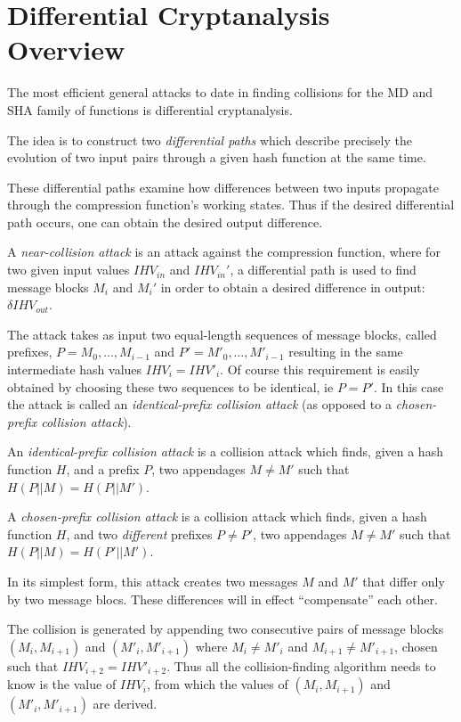 \section{Differential Cryptanalysis Overview}
The most efficient general attacks to date in finding collisions for the MD and SHA family of functions is differential cryptanalysis.

The idea is to construct two \emph{differential paths} which describe precisely the evolution of two input pairs through a given hash function at the same time.

These differential paths examine how differences between two inputs propagate through the compression function's working states. Thus if the desired differential path occurs, one can obtain the desired output difference.
\begin{defn}
A \emph{near-collision attack} is an attack against the compression function, where for two given input values $IHV_{in}$ and $IHV_{in}'$, a differential path is used to find message blocks $M_i$ and $M_i'$ in order to obtain a desired difference in output: $\delta IHV_{out}$.
\end{defn}

The attack takes as input two equal-length sequences of message blocks, called prefixes, $P=M_0,\ldots,M_{i-1}$ and $P'= M'_0,\ldots,M'_{i-1}$ resulting in the same intermediate hash values  $IHV_{i} = IHV'_{i}$. Of course this requirement is easily obtained by choosing these two sequences to be identical, ie $P=P'$. In this case the attack is called an \emph{identical-prefix collision attack} (as opposed to a \emph{chosen-prefix collision attack}).
\begin{defn}
An \emph{identical-prefix collision attack} is a collision attack which finds, given a hash function $H$, and a prefix $P$, two appendages $M \ne M'$ such that $H(P\vert \vert M)=H(P\vert \vert M')$.
\end{defn}
\begin{defn}
A \emph{chosen-prefix collision attack} is a collision attack which finds, given a hash function $H$, and two \emph{different} prefixes $P \ne P'$, two appendages $M \ne M'$ such that $H(P\vert \vert M)=H(P'\vert \vert M')$.   
\end{defn}

In its simplest form, this attack creates two messages $M$ and $M'$ that differ only by two message blocs. These differences will in effect ``compensate'' each other. 

The collision is generated by appending two consecutive pairs of message blocks $(M_i,M_{i+1})$ and $(M'_i,M'_{i+1})$ where $M_i \ne M'_i$ and $M_{i+1} \ne M'_{i+1}$, chosen such that $IHV_{i+2} = IHV'_{i+2}$. Thus all the collision-finding algorithm needs to know is the value of $IHV_{i}$, from which the values of $(M_i,M_{i+1})$ and $(M'_i,M'_{i+1})$ are derived.

